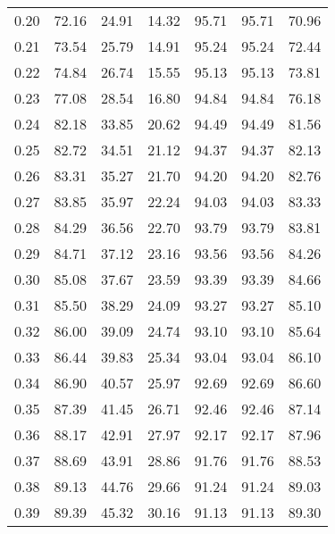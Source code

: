\begin{tabular}{|c|c|c|c|c|c|c|}
      0.20 &     72.16 &     24.91 &      14.32 &   95.71 &      95.71 &         70.96 \\
      0.21 &     73.54 &     25.79 &      14.91 &   95.24 &      95.24 &         72.44 \\
      0.22 &     74.84 &     26.74 &      15.55 &   95.13 &      95.13 &         73.81 \\
      0.23 &     77.08 &     28.54 &      16.80 &   94.84 &      94.84 &         76.18 \\
      0.24 &     82.18 &     33.85 &      20.62 &   94.49 &      94.49 &         81.56 \\
      0.25 &     82.72 &     34.51 &      21.12 &   94.37 &      94.37 &         82.13 \\
      0.26 &     83.31 &     35.27 &      21.70 &   94.20 &      94.20 &         82.76 \\
      0.27 &     83.85 &     35.97 &      22.24 &   94.03 &      94.03 &         83.33 \\
      0.28 &     84.29 &     36.56 &      22.70 &   93.79 &      93.79 &         83.81 \\
      0.29 &     84.71 &     37.12 &      23.16 &   93.56 &      93.56 &         84.26 \\
      0.30 &     85.08 &     37.67 &      23.59 &   93.39 &      93.39 &         84.66 \\
      0.31 &     85.50 &     38.29 &      24.09 &   93.27 &      93.27 &         85.10 \\
      0.32 &     86.00 &     39.09 &      24.74 &   93.10 &      93.10 &         85.64 \\
      0.33 &     86.44 &     39.83 &      25.34 &   93.04 &      93.04 &         86.10 \\
      0.34 &     86.90 &     40.57 &      25.97 &   92.69 &      92.69 &         86.60 \\
      0.35 &     87.39 &     41.45 &      26.71 &   92.46 &      92.46 &         87.14 \\
      0.36 &     88.17 &     42.91 &      27.97 &   92.17 &      92.17 &         87.96 \\
      0.37 &     88.69 &     43.91 &      28.86 &   91.76 &      91.76 &         88.53 \\
      0.38 &     89.13 &     44.76 &      29.66 &   91.24 &      91.24 &         89.03 \\
      0.39 &     89.39 &     45.32 &      30.16 &   91.13 &      91.13 &         89.30 \\

\end{tabular}
